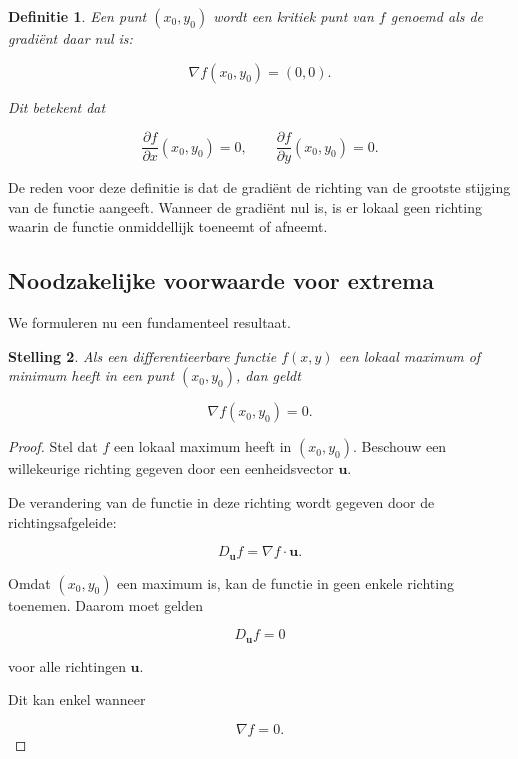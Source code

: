 \documentclass[11pt,a4paper]{article}
\newtheorem{theorem}{Stelling}[section]
\newtheorem{definition}[theorem]{Definitie}
\begin{document}
    \begin{definition}
        Een punt $(x_0,y_0)$ wordt een kritiek punt van $f$ genoemd
        als de gradiënt daar nul is:

        \[
            \nabla f(x_0,y_0) = (0,0).
        \]

        Dit betekent dat

        \[
            \frac{\partial f}{\partial x}(x_0,y_0) = 0,
            \qquad
            \frac{\partial f}{\partial y}(x_0,y_0) = 0.
        \]
    \end{definition}

    De reden voor deze definitie is dat de gradiënt de richting van
    de grootste stijging van de functie aangeeft. Wanneer de gradiënt
    nul is, is er lokaal geen richting waarin de functie onmiddellijk
    toeneemt of afneemt.

    \subsection{Noodzakelijke voorwaarde voor extrema}

    We formuleren nu een fundamenteel resultaat.

    \begin{theorem}
        Als een differentieerbare functie $f(x,y)$ een lokaal maximum
        of minimum heeft in een punt $(x_0,y_0)$, dan geldt

        \[
            \nabla f(x_0,y_0) = 0.
        \]
    \end{theorem}

    \begin{proof}
        Stel dat $f$ een lokaal maximum heeft in $(x_0,y_0)$.
        Beschouw een willekeurige richting gegeven door een eenheidsvector
        $\mathbf{u}$.

        De verandering van de functie in deze richting wordt gegeven
        door de richtingsafgeleide:

        \[
            D_{\mathbf{u}} f = \nabla f \cdot \mathbf{u}.
        \]

        Omdat $(x_0,y_0)$ een maximum is, kan de functie in geen enkele
        richting toenemen. Daarom moet gelden

        \[
            D_{\mathbf{u}} f = 0
        \]

        voor alle richtingen $\mathbf{u}$.

        Dit kan enkel wanneer

        \[
            \nabla f = 0.
        \]
    \end{proof}
\end{document}
